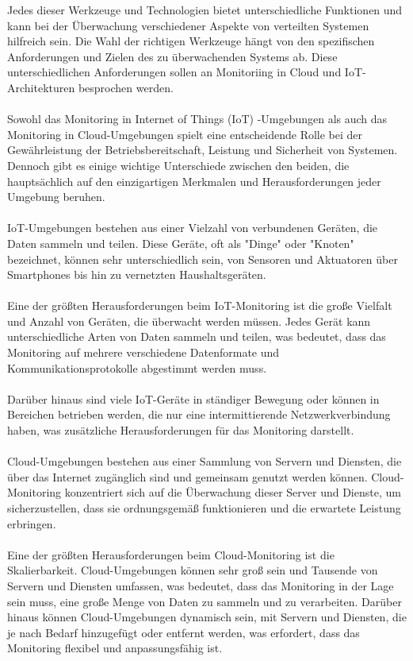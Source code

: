 Jedes dieser Werkzeuge und Technologien bietet unterschiedliche Funktionen und kann bei der Überwachung verschiedener Aspekte von verteilten Systemen hilfreich sein. Die Wahl der richtigen Werkzeuge hängt von den spezifischen Anforderungen und Zielen des zu überwachenden Systems ab. Diese unterschiedlichen Anforderungen sollen an Monitoriing in Cloud und IoT-Architekturen besprochen werden. 
\\\\
Sowohl das Monitoring in Internet of Things (IoT) -Umgebungen als auch das Monitoring in Cloud-Umgebungen spielt eine entscheidende Rolle bei der Gewährleistung der Betriebsbereitschaft, Leistung und Sicherheit von Systemen. Dennoch gibt es einige wichtige Unterschiede zwischen den beiden, die hauptsächlich auf den einzigartigen Merkmalen und Herausforderungen jeder Umgebung beruhen.
\\\\
IoT-Umgebungen bestehen aus einer Vielzahl von verbundenen Geräten, die Daten sammeln und teilen. Diese Geräte, oft als "Dinge" oder "Knoten" bezeichnet, können sehr unterschiedlich sein, von Sensoren und Aktuatoren über Smartphones bis hin zu vernetzten Haushaltsgeräten.
\\\\
Eine der größten Herausforderungen beim IoT-Monitoring ist die große Vielfalt und Anzahl von Geräten, die überwacht werden müssen. Jedes Gerät kann unterschiedliche Arten von Daten sammeln und teilen, was bedeutet, dass das Monitoring auf mehrere verschiedene Datenformate und Kommunikationsprotokolle abgestimmt werden muss.
\\\\
Darüber hinaus sind viele IoT-Geräte in ständiger Bewegung oder können in Bereichen betrieben werden, die nur eine intermittierende Netzwerkverbindung haben, was zusätzliche Herausforderungen für das Monitoring darstellt.
\\\\
Cloud-Umgebungen bestehen aus einer Sammlung von Servern und Diensten, die über das Internet zugänglich sind und gemeinsam genutzt werden können. Cloud-Monitoring konzentriert sich auf die Überwachung dieser Server und Dienste, um sicherzustellen, dass sie ordnungsgemäß funktionieren und die erwartete Leistung erbringen.
\\\\
Eine der größten Herausforderungen beim Cloud-Monitoring ist die Skalierbarkeit. Cloud-Umgebungen können sehr groß sein und Tausende von Servern und Diensten umfassen, was bedeutet, dass das Monitoring in der Lage sein muss, eine große Menge von Daten zu sammeln und zu verarbeiten. Darüber hinaus können Cloud-Umgebungen dynamisch sein, mit Servern und Diensten, die je nach Bedarf hinzugefügt oder entfernt werden, was erfordert, dass das Monitoring flexibel und anpassungsfähig ist.
